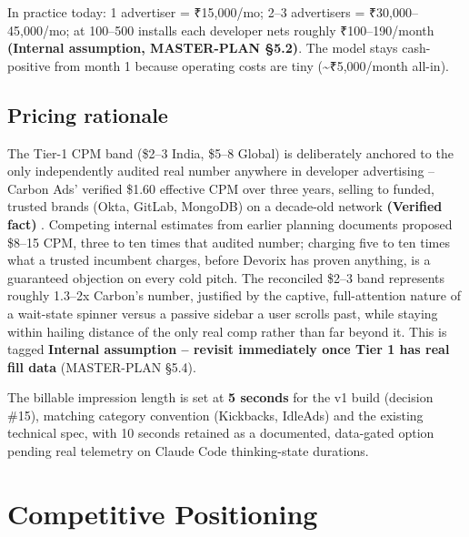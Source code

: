 In practice today: 1 advertiser = ₹15,000/mo; 2--3 advertisers = ₹30,000--45,000/mo; at 100--500 installs each developer nets roughly ₹100--190/month \textbf{(Internal assumption, MASTER-PLAN \S5.2)}. The model stays cash-positive from month 1 because operating costs are tiny (\textasciitilde₹5,000/month all-in).

\subsection{Pricing rationale}

The Tier-1 CPM band (\$2--3 India, \$5--8 Global) is deliberately anchored to the only independently audited real number anywhere in developer advertising -- Carbon Ads' verified \$1.60 effective CPM over three years, selling to funded, trusted brands (Okta, GitLab, MongoDB) on a decade-old network \textbf{(Verified fact)} \cite{pragmaticengineer_carbonads_2024}. Competing internal estimates from earlier planning documents proposed \$8--15 CPM, three to ten times that audited number; charging five to ten times what a trusted incumbent charges, before Devorix has proven anything, is a guaranteed objection on every cold pitch. The reconciled \$2--3 band represents roughly 1.3--2x Carbon's number, justified by the captive, full-attention nature of a wait-state spinner versus a passive sidebar a user scrolls past, while staying within hailing distance of the only real comp rather than far beyond it. This is tagged \textbf{Internal assumption -- revisit immediately once Tier 1 has real fill data} (MASTER-PLAN \S5.4).

The billable impression length is set at \textbf{5 seconds} for the v1 build (decision \#15), matching category convention (Kickbacks, IdleAds) and the existing technical spec, with 10 seconds retained as a documented, data-gated option pending real telemetry on Claude Code thinking-state durations.

\section{Competitive Positioning}
\label{sec:competitive-positioning}

